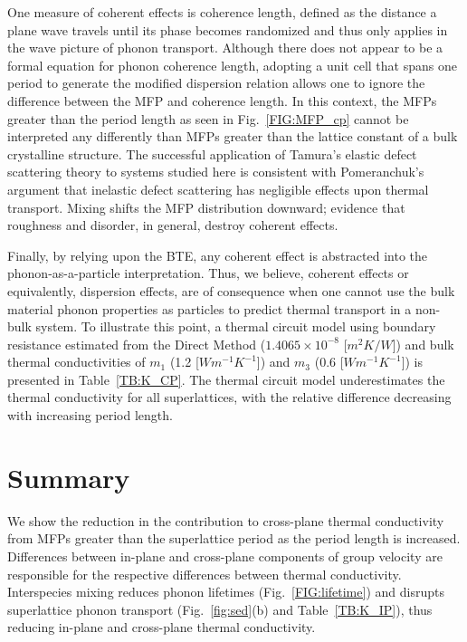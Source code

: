 One measure of coherent effects is coherence length, defined as the distance a plane wave travels until its phase becomes randomized and thus only applies in the wave picture of phonon transport. Although there does not appear to be a formal equation for phonon coherence length, adopting a unit cell that spans one period to generate the modified dispersion relation allows one to ignore the difference between the MFP and coherence length.\cite{PhysRevB.67.195311} In this context, the MFPs greater than the period length as seen in Fig.~\ref{FIG:MFP_cp} cannot be interpreted any differently than MFPs greater than the lattice constant of a bulk crystalline structure. The successful application of Tamura's elastic defect scattering theory to systems studied here is consistent with Pomeranchuk's argument that inelastic defect scattering has negligible effects upon thermal transport.\cite{pomeranchuk1942thermal} Mixing shifts the MFP distribution downward; evidence that roughness and disorder, in general, destroy coherent effects.\cite{PhysRevB.67.195311,dames_682} 

Finally, by relying upon the BTE, any coherent effect is abstracted into the phonon-as-a-particle interpretation. Thus, we believe, coherent effects or equivalently, dispersion effects, are of consequence when one cannot use the bulk material phonon properties as particles to predict thermal transport in a non-bulk system. To illustrate this point, a thermal circuit model using boundary resistance estimated from the Direct Method ($1.4065\times10^{-8}$ [$m^2K/W$]) and bulk thermal conductivities of $m_1$ (1.2 [$Wm^{-1}K^{-1}$]) and $m_3$ (0.6 [$Wm^{-1}K^{-1}$]) is presented in Table~\ref{TB:K_CP}. The thermal circuit model underestimates the thermal conductivity for all superlattices, with the relative difference decreasing with increasing period length.

\section{Summary}

We show the reduction in the contribution to cross-plane thermal conductivity from MFPs greater than the superlattice period as the period length is increased. Differences between in-plane and cross-plane components of group velocity are responsible for the respective differences between thermal conductivity. Interspecies mixing reduces phonon lifetimes (Fig.~\ref{FIG:lifetime}) and disrupts superlattice phonon transport (Fig.~\ref{fig:sed}(b) and Table~\ref{TB:K_IP}), thus reducing in-plane and cross-plane thermal conductivity.

